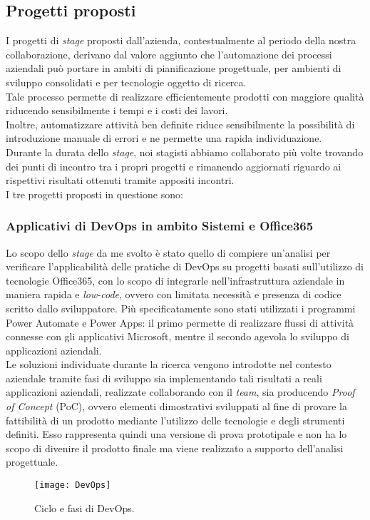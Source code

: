 \subsection{Progetti proposti}
I progetti di \emph{stage} proposti dall'azienda, contestualmente al periodo della nostra collaborazione, derivano dal valore aggiunto che l'automazione dei processi aziendali può portare in ambiti di pianificazione progettuale, per ambienti di sviluppo consolidati e per tecnologie oggetto di ricerca.\\
Tale processo permette di realizzare efficientemente prodotti con maggiore qualità riducendo sensibilmente i tempi e i costi dei lavori.\\
Inoltre, automatizzare attività ben definite riduce sensibilmente la possibilità di introduzione manuale di errori e ne permette una rapida individuazione.\\
Durante la durata dello \emph{stage}, noi stagisti abbiamo collaborato più volte trovando dei punti di incontro tra i propri progetti e rimanendo aggiornati riguardo ai rispettivi risultati ottenuti tramite appositi incontri.\\
I tre progetti proposti in questione sono: 

\subsubsection*{Applicativi di DevOps in ambito Sistemi e Office365}
\label{mioStage}
Lo scopo dello \emph{stage} da me svolto è stato quello di compiere un'analisi per verificare l'applicabilità delle pratiche di \gls{DevOps} su progetti basati sull'utilizzo di tecnologie Office365, con lo scopo di integrarle nell'infrastruttura aziendale in maniera rapida e \emph{low-code}, ovvero con limitata necessità e presenza di codice scritto dallo sviluppatore. Più specificatamente sono stati utilizzati i programmi Power Automate e Power Apps: il primo permette di realizzare flussi di attività connesse con gli applicativi Microsoft, mentre il secondo agevola lo sviluppo di applicazioni aziendali.\\
Le soluzioni individuate durante la ricerca vengono introdotte nel contesto aziendale tramite fasi di sviluppo sia implementando tali risultati a reali applicazioni aziendali, realizzate collaborando con il \emph{team}, sia producendo \emph{Proof of Concept} (PoC), ovvero elementi dimostrativi sviluppati al fine di provare la fattibilità di un prodotto mediante l'utilizzo delle tecnologie e degli strumenti definiti. Esso rappresenta quindi una versione di prova prototipale e non ha lo scopo di divenire il prodotto finale ma viene realizzato a supporto dell'analisi progettuale.
\begin{figure}[htbp] 
    \centering 
    \texttt{[image: DevOps]}
    \caption{Ciclo e fasi di DevOps.} 
    \label{fig:DevOps}
\end{figure}

